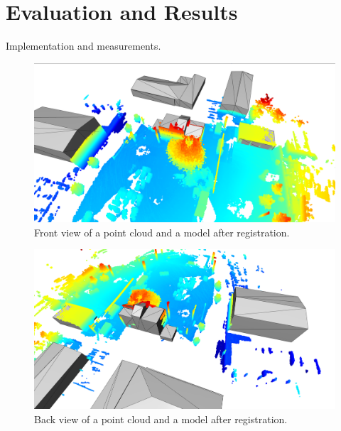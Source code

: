 

    \chapter{Evaluation and Results}

    Implementation and measurements.

    \begin{figure}[H]
        \centering
        \includegraphics[scale=0.2]{images/solution_images/final_front.png}
        \caption{Front view of a point cloud and a model after registration.}
        \label{fig:final_front_model}
    \end{figure}
  
    \begin{figure}[H]
        \centering
        \includegraphics[scale=0.2]{images/solution_images/final_back.png}
        \caption{Back view of a point cloud and a model after registration.}
        \label{fig:final_back_model}
    \end{figure}

    

